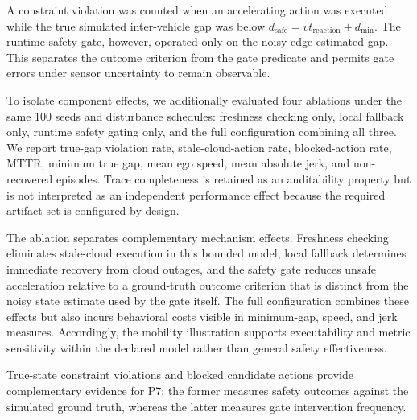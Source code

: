 A constraint violation was counted when an accelerating action was executed while the true simulated inter-vehicle gap was below
\(d_{\mathrm{safe}}=v t_{\mathrm{reaction}}+d_{\min}\).
The runtime safety gate, however, operated only on the noisy edge-estimated gap.
This separates the outcome criterion from the gate predicate and permits gate errors under sensor uncertainty to remain observable.

To isolate component effects, we additionally evaluated four ablations under the same 100 seeds and disturbance schedules:
freshness checking only, local fallback only, runtime safety gating only, and the full configuration combining all three.
We report true-gap violation rate, stale-cloud-action rate, blocked-action rate, MTTR, minimum true gap, mean ego speed,
mean absolute jerk, and non-recovered episodes. Trace completeness is retained as an auditability property but is not interpreted
as an independent performance effect because the required artifact set is configured by design.

The ablation separates complementary mechanism effects. Freshness checking eliminates stale-cloud execution in this bounded model,
local fallback determines immediate recovery from cloud outages, and the safety gate reduces unsafe acceleration relative to a
ground-truth outcome criterion that is distinct from the noisy state estimate used by the gate itself. The full configuration
combines these effects but also incurs behavioral costs visible in minimum-gap, speed, and jerk measures. Accordingly, the mobility
illustration supports executability and metric sensitivity within the declared model rather than general safety effectiveness.

True-state constraint violations and blocked candidate actions provide complementary evidence for P7: the former measures safety
outcomes against the simulated ground truth, whereas the latter measures gate intervention frequency.
